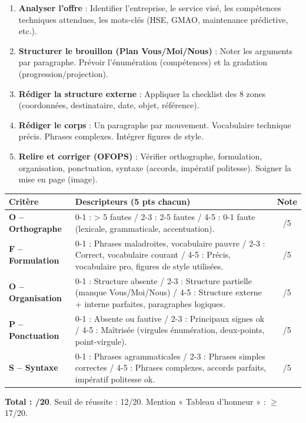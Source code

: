\documentclass[11pt]{article}
\begin{document}
\begin{methode}
\begin{enumerate}
    \item \textbf{Analyser l'offre} : Identifier l'entreprise, le service visé, les compétences techniques attendues, les mots-clés (HSE, GMAO, maintenance prédictive, etc.).
    \item \textbf{Structurer le brouillon (Plan Vous/Moi/Nous)} : Noter les arguments par paragraphe. Prévoir l'énumération (compétences) et la gradation (progression/projection).
    \item \textbf{Rédiger la structure externe} : Appliquer la checklist des 8 zones (coordonnées, destinataire, date, objet, référence).
    \item \textbf{Rédiger le corps} : Un paragraphe par mouvement. Vocabulaire technique précis. Phrases complexes. Intégrer figures de style.
    \item \textbf{Relire et corriger (OFOPS)} : Vérifier orthographe, formulation, organisation, ponctuation, syntaxe (accords, impératif politesse). Soigner la mise en page (image).
\end{enumerate}
\end{methode}

\begin{aretenir}
\begin{center}
\begin{tabularx}{\linewidth}{|l|X|c|}\hline
\textbf{Critère} & \textbf{Descripteurs (5 pts chacun)} & \textbf{Note} \\ \hline
\textbf{O -- Orthographe} & 0-1 : > 5 fautes / 2-3 : 2-5 fautes / 4-5 : 0-1 faute (lexicale, grammaticale, accentuation). & /5 \\ \hline
\textbf{F -- Formulation} & 0-1 : Phrases maladroites, vocabulaire pauvre / 2-3 : Correct, vocabulaire courant / 4-5 : Précis, vocabulaire pro, figures de style utilisées. & /5 \\ \hline
\textbf{O -- Organisation} & 0-1 : Structure absente / 2-3 : Structure partielle (manque Vous/Moi/Nous) / 4-5 : Structure externe + interne parfaites, paragraphes logiques. & /5 \\ \hline
\textbf{P -- Ponctuation} & 0-1 : Absente ou fautive / 2-3 : Principaux signes ok / 4-5 : Maîtrisée (virgules énumération, deux-points, point-virgule). & /5 \\ \hline
\textbf{S -- Syntaxe} & 0-1 : Phrases agrammaticales / 2-3 : Phrases simples correctes / 4-5 : Phrases complexes, accords parfaits, impératif politesse ok. & /5 \\ \hline
\end{tabularx}
\end{center}
\textbf{Total : /20}. Seuil de réussite : 12/20. Mention « Tableau d'honneur » : $\ge$ 17/20.
\end{aretenir}
\end{document}
